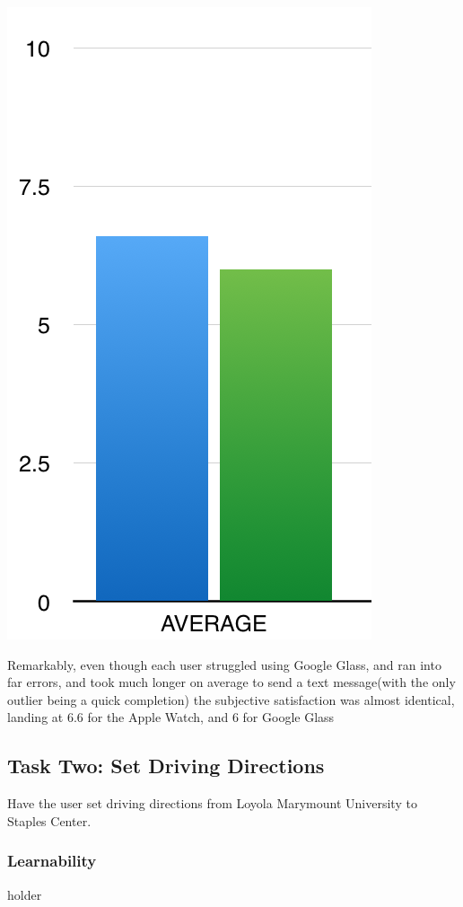 \documentclass[paper=a4, fontsize=11pt]{scrartcl}	%
\numberwithin{equation}{section}															%
\numberwithin{figure}{section}																%
\numberwithin{table}{section}																%
\begin{document}
\includegraphics[scale=0.8]{task1satav}



Remarkably, even though each user struggled using Google Glass, and ran into far errors, and took much longer on average to send a text message(with the only outlier being a quick completion) the subjective satisfaction was almost identical, landing at 6.6 for the Apple Watch, and 6 for Google Glass

\subsection{Task Two: Set Driving Directions}
Have the user set driving directions from Loyola Marymount University to Staples Center.

\subsubsection{Learnability}
holder
\end{document}

